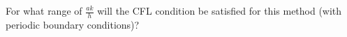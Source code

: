 For what range of $\frac{ak}{h}$ will the CFL condition be satisfied for this method (with periodic boundary 
conditions)?

\begin{solution}\ \\\\
    \hfill\vfill
    \ \\
\end{solution}